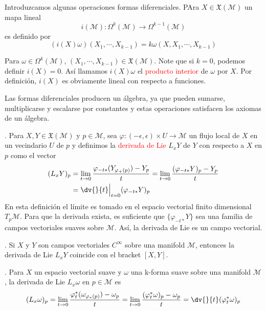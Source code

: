 \documentclass[../main]{subfiles}
\begin{document}
\begin{adjustwidth}{0pt}{-100pt}
Introduzcamos algunas operaciones formas diferenciales. PAra $X \in \mathfrak{X}(\mathcal{M})$ un mapa lineal 
\begin{equation}
    i(\mathcal{M}): \Omega^k(\mathcal{M}) \rightarrow \Omega^{k-1}(\mathcal{M})
\end{equation}
es definido por 
\begin{equation}
    (i(X)\omega)(X_1, \cdots, X_{k-1})=k\omega(X, X_1, \cdots, X_{k-1})
\end{equation}

Para $\omega \in \Omega^k(\mathcal{M})$, $(X_1, \cdots, X_{k-1}) \in \mathfrak{X}(\mathcal{M})$. Note que si $k=0$, podemos definir $i(X)=0$. Así llamamos $i(X)\omega$ el \textcolor{red}{producto interior} de $\omega$ por $X$. Por definición, $i(X)$ es obviamente lineal con respecto a funciones. 

\proposicion{} Las formas diferenciales producen un álgebra, ya que pueden sumarse, multiplicarse y escalarse por constantes y estas operaciones satisfacen los axiomas de un álgebra.

. Para $X, Y \in \mathfrak{X}(\mathcal{M})$ y $p \in \mathcal{M}$, sea $\varphi: (-\epsilon, \epsilon) \times U \rightarrow \mathcal{M}$ un flujo local de $X$ en un vecindario $U$ de $p$ y definimos la \textcolor{red}{derivada de Lie} $L_x Y$ de $Y$ con respecto a $X$ en $p$ como el vector 
\begin{equation}
    \begin{split}
        (L_x Y)_p&= \lim_{t \rightarrow 0} \dfrac{\varphi_{-t*}(Y_{\varphi_+(p)})-Y_p}{t}=\lim_{t \rightarrow 0} \dfrac{(\varphi_{-t*} Y)_p-Y_p}{t}\\
        &=\dv{}{t}\Big{|}_{t=0}(\varphi_{-t*}Y)_p
    \end{split}
\end{equation}
En esta definición el límite es tomado en el espacio vectorial finito dimensional $T_p \mathcal{M}$. Para que la derivada exista, es suficiente que $\{\varphi_{-t*}Y\}$ sea una familia de campos vectoriales suaves sobre $\mathcal{M}$. Así, la derivada de Lie es un campo vectorial.

\teorema{\textcolor{red}{(Lie Bracket)}}. Si $X$ y $Y$ son campos vectoriales $C^{\infty}$ sobre una manifold $\mathcal{M}$, entonces la derivada de Lie $L_x Y$ coincide con el bracket $[X, Y]$.

. Para $X$ un espacio vectorial suave y $\omega$ una k-forma suave sobre una manifold $\mathcal{M}$, la derivada de Lie $L_x \omega$ en $p\in \mathcal{M}$ es 
\begin{equation}
    (L_x \omega)_p=\lim_{t \rightarrow 0} \dfrac{\varphi^*_t(\omega_{\varphi_*(p)})-\omega_p}{t}=\lim_{t \rightarrow 0}\dfrac{(\varphi^*_t \omega)_p-\omega_p}{t}=\dv{}{t}(\varphi^*_t \omega)_p
\end{equation}


\end{adjustwidth}
\end{document}

